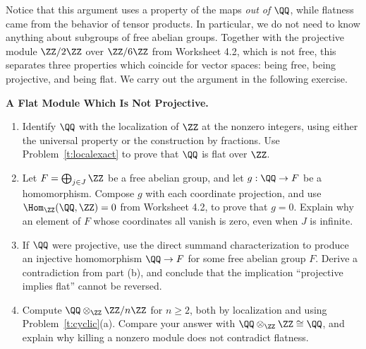 \documentclass[12pt,reqno]{amsart}
\begin{document}
Notice that this argument uses a property of the maps \emph{out of} $\QQ$, while flatness came from the behavior of tensor products. In particular, we do not need to know anything about subgroups of free abelian groups. Together with the projective module $\ZZ/2\ZZ$ over $\ZZ/6\ZZ$ from Worksheet 4.2, which is not free, this separates three properties which coincide for vector spaces: being free, being projective, and being flat. We carry out the argument in the following exercise.

\hrulefill

\begin{problems}
\item\label{t:rationals} \textbf{A Flat Module Which Is Not Projective.}
\begin{enumerate}
\item Identify $\QQ$ with the localization of $\ZZ$ at the nonzero integers, using either the universal property or the construction by fractions. Use Problem~\ref{t:localexact} to prove that $\QQ$ is flat over $\ZZ$.
\item Let $F=\bigoplus_{j\in J}\ZZ$ be a free abelian group, and let $g:\QQ\to F$ be a homomorphism. Compose $g$ with each coordinate projection, and use $\Hom_{\ZZ}(\QQ,\ZZ)=0$ from Worksheet 4.2, to prove that $g=0$. Explain why an element of $F$ whose coordinates all vanish is zero, even when $J$ is infinite.
\item If $\QQ$ were projective, use the direct summand characterization to produce an injective homomorphism $\QQ\to F$ for some free abelian group $F$. Derive a contradiction from part (b), and conclude that the implication ``projective implies flat'' cannot be reversed.
\item Compute $\QQ\otimes_{\ZZ}\ZZ/n\ZZ$ for $n\geq2$, both by localization and using Problem~\ref{t:cyclic}(a). Compare your answer with $\QQ\otimes_{\ZZ}\ZZ\cong\QQ$, and explain why killing a nonzero module does not contradict flatness.
\end{enumerate}
\end{problems}

\hrulefill
\end{document}
